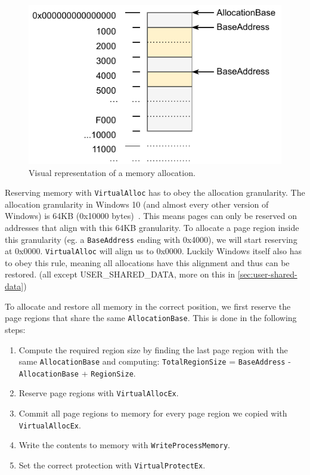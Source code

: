 \documentclass[a4paper, 11pt, english]{report}
\begin{document}
\begin{figure}[h]
\centerline{\includegraphics{images/memory-allocation.drawio.pdf}}
\caption{Visual representation of a memory allocation.}
\label{fig:virtual-allocation}
\end{figure}

Reserving memory with \texttt{VirtualAlloc} has to obey the allocation granularity. The allocation granularity in Windows 10 (and almost every other version of Windows) is 64KB (0x10000 bytes)~\cite[][p.107]{what-makes-it-page}. This means pages can only be reserved on addresses that align with this 64KB granularity. To allocate a page region inside this granularity (eg. a \texttt{BaseAddress} ending with 0x4000), we will start reserving at 0x0000. \texttt{VirtualAlloc} will align us to 0x0000. Luckily Windows itself also has to obey this rule, meaning all allocations have this alignment and thus can be restored. (all except USER\_SHARED\_DATA, more on this in \autoref{sec:user-shared-data}) 

To allocate and restore all memory in the correct position, we first reserve the page regions that share the same \texttt{AllocationBase}. This is done in the following steps: 
\begin{enumerate}
	\item Compute the required region size by finding the last page region with the same \texttt{AllocationBase} and computing: \texttt{TotalRegionSize} = \texttt{BaseAddress} - \texttt{AllocationBase} + \texttt{RegionSize}.
	\item Reserve page regions with \texttt{VirtualAllocEx}.
	\item Commit all page regions to memory for every page region we copied with \texttt{VirtualAllocEx}.
	\item Write the contents to memory with \texttt{WriteProcessMemory}.
	\item Set the correct protection with \texttt{VirtualProtectEx}.
\end{enumerate}
\end{document}
